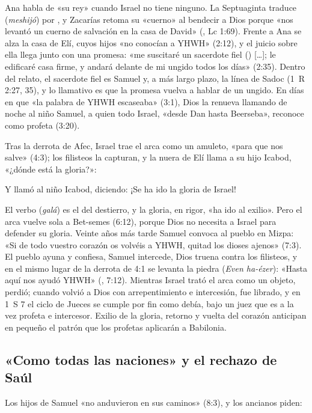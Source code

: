 Ana habla de «su rey» cuando Israel no tiene ninguno. La Septuaginta traduce  (\emph{meshijó}) por , y Zacarías retoma su «cuerno» al bendecir a Dios porque «nos levantó un cuerno de salvación en la casa de David» (, Lc 1:69). Frente a Ana se alza la casa de Elí, cuyos hijos «no conocían a YHWH» (2:12), y el juicio sobre ella llega junto con una promesa: «me suscitaré un sacerdote fiel () [\ldots]; le edificaré casa firme, y andará delante de mi ungido todos los días» (2:35). Dentro del relato, el sacerdote fiel es Samuel y, a más largo plazo, la línea de Sadoc (1~R 2:27, 35), y lo llamativo es que la promesa vuelva a hablar de un ungido. En días en que «la palabra de YHWH escaseaba» (3:1), Dios la renueva llamando de noche al niño Samuel, a quien todo Israel, «desde Dan hasta Beerseba», reconoce como profeta (3:20).

Tras la derrota de Afec, Israel trae el arca como un amuleto, «para que nos salve» (4:3); los filisteos la capturan, y la nuera de Elí llama a su hijo Icabod, «¿dónde está la gloria?»:

\begin{cita}Y llamó al niño Icabod, diciendo: ¡Se ha ido la gloria de Israel!\end{cita}

El verbo  (\emph{galá}) es el del destierro, y la gloria, en rigor, «ha ido al exilio». Pero el arca vuelve sola a Bet-semes (6:12), porque Dios no necesita a Israel para defender su gloria. Veinte años más tarde Samuel convoca al pueblo en Mizpa: «Si de todo vuestro corazón os volvéis a YHWH, quitad los dioses ajenos» (7:3). El pueblo ayuna y confiesa, Samuel intercede, Dios truena contra los filisteos, y en el mismo lugar de la derrota de 4:1 se levanta la piedra  (\emph{Even ha-ézer}): «Hasta aquí nos ayudó YHWH» (, 7:12). Mientras Israel trató el arca como un objeto, perdió; cuando volvió a Dios con arrepentimiento e intercesión, fue librado, y en 1~S 7 el ciclo de Jueces se cumple por fin como debía, bajo un juez que es a la vez profeta e intercesor. Exilio de la gloria, retorno y vuelta del corazón anticipan en pequeño el patrón que los profetas aplicarán a Babilonia.

\subsection{«Como todas las naciones» y el rechazo de Saúl}
Los hijos de Samuel «no anduvieron en sus caminos» (8:3), y los ancianos piden:

